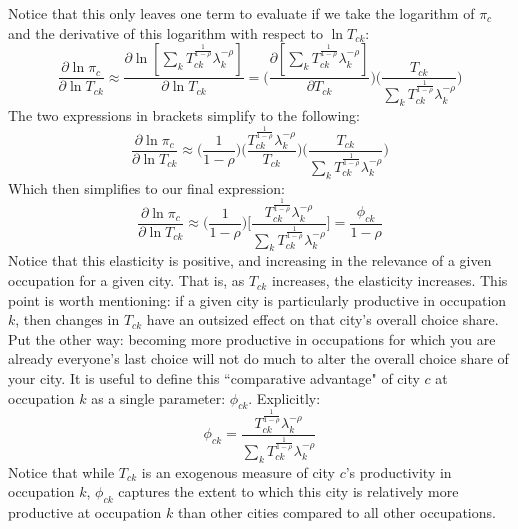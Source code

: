 \documentclass[12pt]{article}
\begin{document}
Notice that this only leaves one term to evaluate if we take the logarithm of $\pi_{c}$ and the derivative of this logarithm with respect to $\ln{T_{ck}}$:
\begin{equation*}
    \frac{\partial\ln{\pi_{c}}}{\partial\ln{T_{ck}}} \approx \frac{\partial\ln[{\sum\limits_{k}{T^{\frac{1}{1-\rho}}_{ck}}\lambda_{k}^{-\rho}}]}{\partial\ln{T_{ck}}} = \Bigg(\frac{\partial[{\sum\limits_{k}{T^{\frac{1}{1-\rho}}_{ck}}\lambda_{k}^{-\rho}}]}{\partial{T_{ck}}}\Bigg)\Bigg(\frac{T_{ck}}{{\sum\limits_{k}{T^{\frac{1}{1-\rho}}_{ck}}\lambda_{k}^{-\rho}}}\Bigg)
\end{equation*}
The two expressions in brackets simplify to the following:
\begin{equation*}
    \frac{\partial\ln{\pi_{c}}}{\partial\ln{T_{ck}}} \approx \Bigg(\frac{1}{1-\rho}\Bigg)\Bigg(\frac{T_{ck}^{\frac{1}{1-\rho}}\lambda_{k}^{-\rho}}{T_{ck}}\Bigg)\Bigg(\frac{T_{ck}}{{\sum\limits_{k}{T^{\frac{1}{1-\rho}}_{ck}}\lambda_{k}^{-\rho}}}\Bigg)
\end{equation*}
Which then simplifies to our final expression:
\begin{equation}
    \frac{\partial\ln{\pi_{c}}}{\partial\ln{T_{ck}}} \approx \Big(\frac{1}{1-\rho}\Big)\Bigg[\frac{{T^{\frac{1}{1-\rho}}_{ck}}\lambda_{k}^{-\rho}}{\sum\limits_{k}{T^{\frac{1}{1-\rho}}_{ck}}\lambda_{k}^{-\rho}}\Bigg] = \frac{\phi_{ck}}{1-\rho}
\end{equation}
Notice that this elasticity is positive, and increasing in the relevance of a given occupation for a given city. That is, as $T_{ck}$ increases, the elasticity increases. This point is worth mentioning: if a given city is particularly productive in occupation $k$, then changes in $T_{ck}$ have an outsized effect on that city's overall choice share. Put the other way: becoming more productive in occupations for which you are already everyone's last choice will not do much to alter the overall choice share of your city. It is useful to define this ``comparative advantage" of city $c$ at occupation $k$ as a single parameter: $\phi_{ck}$. Explicitly:
\begin{equation*}
    \phi_{ck} = \frac{{T^{\frac{1}{1-\rho}}_{ck}}\lambda_{k}^{-\rho}}{\sum\limits_{k}{T^{\frac{1}{1-\rho}}_{ck}}\lambda_{k}^{-\rho}}
\end{equation*}
Notice that while $T_{ck}$ is an exogenous measure of city $c$'s productivity in occupation $k$, $\phi_{ck}$ captures the extent to which this city is relatively more productive at occupation $k$ than other cities compared to all other occupations.
\end{document}
